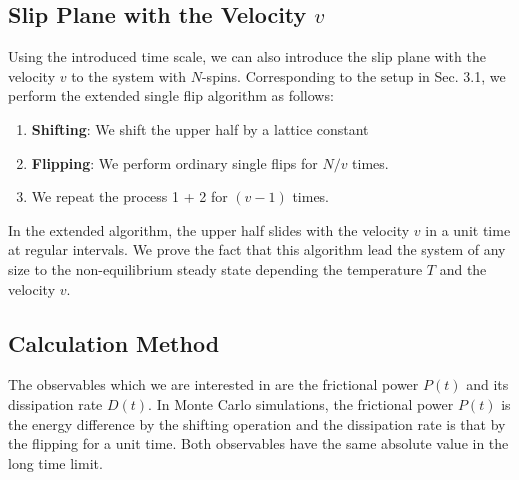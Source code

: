 \subsection{Slip Plane with the Velocity $v$}

Using the introduced time scale, we can also introduce the slip plane with the velocity $v$ to the system with $N$-spins. Corresponding to the setup in Sec. 3.1, we perform the extended single flip algorithm as follows:
\begin{enumerate}
	\item \textbf{Shifting}: We shift the upper half by a lattice constant
	\item \textbf{Flipping}: We perform ordinary single flips for $N/v$ times.
	\item We repeat the process 1 + 2 for $(v-1)$ times.
\end{enumerate}
In the extended algorithm, the upper half slides with the velocity $v$ in a unit time at regular intervals. We prove the fact that this algorithm lead the system of any size to the non-equilibrium steady state depending the temperature $T$ and the velocity $v$.

\subsection{Calculation Method}

The observables which we are interested in are the frictional power $P(t)$ and its dissipation rate $D(t)$. In Monte Carlo simulations, the frictional power $P(t)$ is the energy difference by the shifting operation and the dissipation rate is that by the flipping for a unit time. Both observables have the same absolute value in the long time limit.

